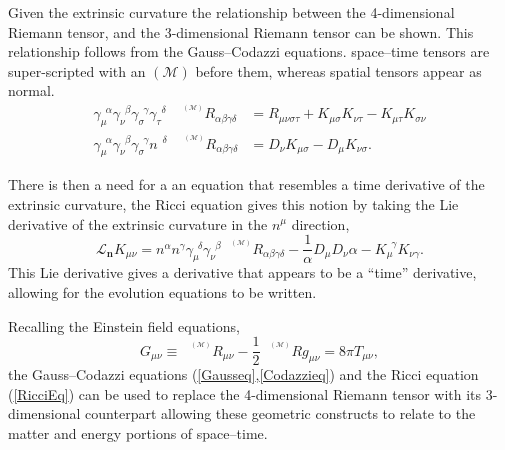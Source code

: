 \documentclass[11pt]{article}
\newcommand{\blank}{\enspace}
\newcommand{\sttensor}{\text{ }{\scriptscriptstyle ^{^{(\mathcal{M})}}}}
\numberwithin{equation}{section}
\begin{document}
Given the extrinsic curvature the relationship between the 4-dimensional Riemann tensor, and the 3-dimensional Riemann tensor can be shown. This relationship follows from the Gauss--Codazzi equations. space--time tensors are super-scripted with an $(\mathcal{M})$ before them, whereas spatial tensors appear as normal. 
\begin{align}
     \gamma_{\mu}^{\blank\alpha} \gamma_{\nu}^{\blank\beta} \gamma_{\sigma}^{\blank\gamma} \gamma_{\tau}^{\blank\delta}\blank \sttensor R_{\alpha\beta\gamma\delta} &= R_{\mu\nu\sigma\tau} + K_{\mu\sigma}K_{\nu\tau} - K_{\mu\tau}K_{\sigma\nu} \label{Gausseq}\\
    \gamma_{\mu}^{\blank\alpha} \gamma_{\nu}^{\blank\beta} \gamma_{\sigma}^{\blank\gamma} n^{\blank\delta}\blank \sttensor R_{\alpha\beta\gamma\delta} &= D_{\nu}K_{\mu\sigma} - D_{\mu} K_{\nu\sigma}. \label{Codazzieq}
\end{align}


There is then a need for a an equation that resembles a time derivative of the extrinsic curvature, the Ricci equation gives this notion by taking the Lie derivative of the extrinsic curvature in the $n^{\mu}$ direction, 
\begin{equation} \label{RicciEq}
    \mathcal{L}_{\textbf{n}}K_{\mu\nu} = n^{\alpha} n^{\gamma} \gamma_{\mu}^{\blank\delta} \gamma_{\nu}^{\blank\beta} \text{ } {\scriptscriptstyle ^{^{(\mathcal{M})}}}R_{\alpha\beta\gamma\delta} - \frac{1}{\alpha} D_{\mu} D_{\nu} \alpha - K^{\blank\gamma}_{\mu} K_{\nu\gamma}.
\end{equation}
This Lie derivative gives a derivative that appears to be a ``time'' derivative, allowing for the evolution equations to be written. 

Recalling the Einstein field equations, 
\begin{equation} \label{newEFE}
    G_{\mu\nu} \equiv \sttensor R_{\mu\nu} - \frac12\sttensor R g_{\mu\nu} = 8\pi T_{\mu\nu},
\end{equation}
the Gauss--Codazzi equations (\ref{Gausseq},\ref{Codazzieq}) and the Ricci equation (\ref{RicciEq}) can be used to replace the 4-dimensional Riemann tensor with its 3-dimensional counterpart allowing these geometric constructs to relate to the matter and energy portions of space--time. 
\end{document}
